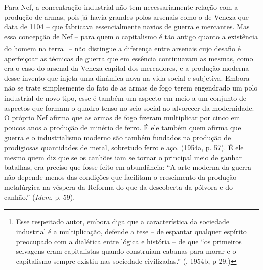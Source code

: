 Para Nef, a concentração industrial não tem necessariamente relação com
a produção de armas, pois já havia grandes polos arsenais como o de
Veneza que data de 1104 -- que fabricava essencialmente navios de guerra
e mercantes. Mas essa concepção de Nef -- para quem o capitalismo é tão
antigo quanto a existência do homem na terra\footnote{Esse respeitado
  autor, embora diga que a característica da sociedade industrial é a
  multiplicação, defende a tese -- de espantar qualquer espírito
  preocupado com a dialética entre lógica e história -- de que ``os
  primeiros selvagens eram capitalistas quando construíam cabanas para
  morar e o capitalismo sempre existiu nas sociedade civilizadas.''
  (, 1954b, p 29.)} -- não distingue a diferença entre arsenais cujo
desafio é aperfeiçoar as técnicas de guerra que em essência continuavam
as mesmas, como era o caso do arsenal da Veneza capital dos mercadores,
e a produção moderna desse invento que injeta uma dinâmica nova na vida
social e subjetiva. Embora não se trate simplesmente do fato de as armas
de fogo terem engendrado um polo industrial de novo tipo, esse é também
um aspecto em meio a um conjunto de aspectos que formam o quadro tenso
no seio social ao alvorecer da modernidade. O próprio Nef afirma que as
armas de fogo fizeram multiplicar por cinco em poucos anos a produção de
minério de ferro. É ele também quem afirma que guerra e o industrialismo
moderno são também fundados na produção de prodigiosas quantidades de
metal, sobretudo ferro e aço. (1954a, p. 57). É ele mesmo quem diz que
se os canhões iam se tornar o principal meio de ganhar batalhas, era
preciso que fosse feito em abundância: ``A arte moderna da guerra não
depende menos das condições que facilitam o crescimento da produção
metalúrgica na véspera da Reforma do que da descoberta da pólvora e do
canhão.'' (\emph{Idem}, p. 59).

